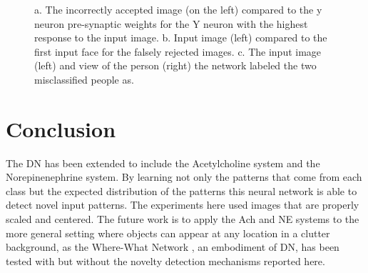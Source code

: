 \documentclass[conference]{IEEEtran}
\begin{document}
\begin{figure}
\begin{tabular}{cc}
\end{tabular}
\caption{a. The incorrectly accepted image (on the left) compared to the y neuron pre-synaptic weights for the Y neuron with the highest response to the input image. b. Input image (left) compared to the first input face for the falsely rejected images. c. The input image (left) and view of the person (right) the network labeled the two misclassified people as.}
\label{fig:6_epoch_errors}
\end{figure}

\section{Conclusion}
The DN has been extended to include the Acetylcholine system and the Norepinenephrine system. 
By learning not only the patterns that come from each class but the expected distribution of the patterns this neural network is able to detect novel input patterns. The experiments here used images that are properly scaled and centered.   The future work is to apply the Ach and NE systems to the more general setting where
objects can appear at any location in a clutter background, as the Where-What Network \cite{WengNAI12}, an embodiment 
of DN, has been tested with but without the novelty detection mechanisms reported here. 


\label{SE:bib}

%

\end{document}
